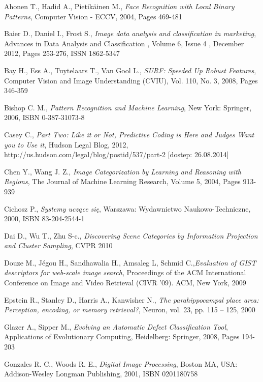 \begin{thebibliography}{100} %

 Ahonen T., Hadid A., Pietikäinen M., \emph{Face Recognition with Local Binary Patterns}, Computer Vision - ECCV, 2004, Pages 469-481

 Baier D., Daniel I., Frost S., \emph{Image data analysis and classification in marketing}, Advances in Data Analysis and Classification , Volume 6, Issue 4 , December 2012, Pages 253-276, ISSN 1862-5347

 Bay H., Ess A., Tuytelaars T., Van Gool L., \emph{SURF: Speeded Up Robust Features},  Computer Vision and Image Understanding (CVIU), Vol. 110, No. 3, 2008, Pages 346-359 

 Bishop C. M., \emph{Pattern Recognition and Machine Learning}, New York: Springer, 2006, ISBN 0-387-31073-8

 Casey C., \emph{Part Two: Like it or Not, Predictive Coding is Here and Judges Want you to Use it}, Hudson Legal Blog, 2012, http://us.hudson.com/legal/blog/postid/537/part-2 [dostep: 26.08.2014]

 Chen Y., Wang J. Z., \emph{Image Categorization by Learning and Reasoning with Regions}, The Journal of Machine Learning Research, Volume 5, 2004, Pages 913-939 

 Cichosz P., \emph{Systemy uczące się}, Warszawa: Wydawnictwo Naukowo-Techniczne, 2000, ISBN 83-204-2544-1

 Dai D., Wu T., Zhu S-c., \emph{Discovering Scene Categories by Information Projection and Cluster Sampling}, CVPR 2010

 Douze M., Jégou H., Sandhawalia H., Amsaleg L, Schmid C.,\emph{Evaluation of GIST descriptors for web-scale image search}, Proceedings of the ACM International Conference on Image and Video Retrieval (CIVR '09). ACM, New York, 2009

 Epstein R., Stanley D., Harris A., Kanwisher N., \emph{The parahippocampal place area: Perception, encoding, or memory retrieval?}, Neuron, vol. 23, pp. 115 – 125, 2000

 Glazer A., Sipper M., \emph{Evolving an Automatic Defect Classification Tool}, Applications of Evolutionary Computing, Heidelberg: Springer, 2008, Pages 194-203

 Gonzales R. C., Woods R. E., \emph{Digital Image Processing}, Boston MA, USA: Addison-Wesley Longman Publishing, 2001, ISBN 0201180758


\end{thebibliography}

